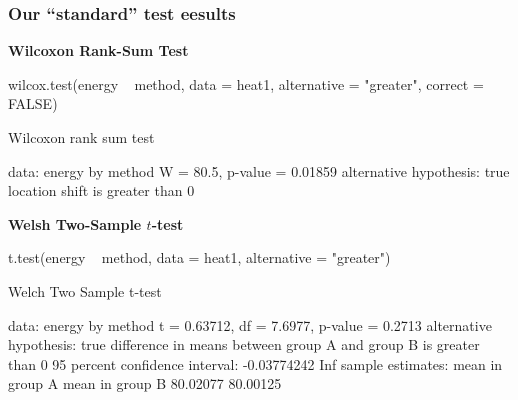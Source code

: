 \documentclass[a4paper]{article}\usepackage[]{graphicx}\usepackage[]{xcolor}
\begin{document}
\subsubsection{Our ``standard'' test eesults}
\textbf{Wilcoxon Rank-Sum Test}
\begin{Schunk}
\begin{Sinput}
wilcox.test(energy ~ method, data = heat1, alternative = "greater", correct = FALSE)
\end{Sinput}
\begin{Soutput}

	Wilcoxon rank sum test

data:  energy by method
W = 80.5, p-value = 0.01859
alternative hypothesis: true location shift is greater than 0
\end{Soutput}
\end{Schunk}
\textbf{Welsh Two-Sample \( t \)-test}
\begin{Schunk}
\begin{Sinput}
t.test(energy ~ method, data = heat1, alternative = "greater")
\end{Sinput}
\begin{Soutput}

	Welch Two Sample t-test

data:  energy by method
t = 0.63712, df = 7.6977, p-value = 0.2713
alternative hypothesis: true difference in means between group A and group B is greater than 0
95 percent confidence interval:
 -0.03774242         Inf
sample estimates:
mean in group A mean in group B 
       80.02077        80.00125 
\end{Soutput}
\end{Schunk}
\end{document}
